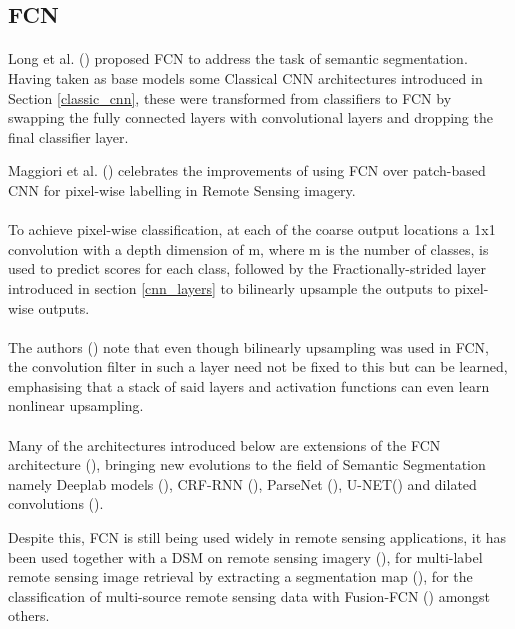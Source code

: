 \subsection{\gls{FCN}} 
\paragraph{}
Long et al. (\cite{long2015fully}) proposed \gls{FCN} to address the task of semantic segmentation. Having taken as base models some Classical \gls{CNN} architectures introduced in Section \ref{classic_cnn}, these were transformed from classifiers to \gls{FCN} by swapping the fully connected layers with convolutional layers and dropping the final classifier layer. 

Maggiori et al. (\cite{7730322}) celebrates the improvements of using \gls{FCN} over patch-based \gls{CNN} for pixel-wise labelling in Remote Sensing imagery.
\paragraph{}
To achieve pixel-wise classification, at each of the coarse output locations a 1x1 convolution with a depth dimension of m, where m is the number of classes, is used to predict scores for each class, followed by the Fractionally-strided layer introduced in section \ref{cnn_layers} to bilinearly upsample the outputs to pixel-wise outputs. 

\paragraph{}
The authors (\cite{long2015fully}) note that even though bilinearly upsampling was used in \gls{FCN}, the convolution filter in such a layer need not be fixed to this but can be learned, emphasising that a stack of said layers and activation functions can even learn nonlinear upsampling.
\paragraph{}
Many of the architectures introduced below are extensions of the \gls{FCN} architecture (\cite{long2015fully}), bringing new evolutions to the field of Semantic Segmentation namely Deeplab models (\cite{chen2016semantic}), \gls{CRF}-\gls{RNN} (\cite{Zheng_2015}), ParseNet (\cite{liu2015parsenet}), U-NET(\cite{ronneberger2015unet}) and dilated convolutions (\cite{yu2016multiscale}).


Despite this, \gls{FCN} is still being used widely in remote sensing applications, it has been used together with a \gls{DSM} on remote sensing imagery (\cite{8281008}), for multi-label remote sensing image retrieval by extracting a segmentation map (\cite{8954885}), for the classification of multi-source remote sensing data with  Fusion-\gls{FCN} (\cite{8518295}) amongst others.

